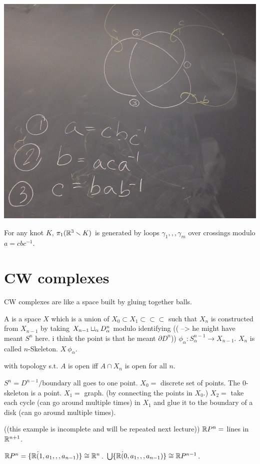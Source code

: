 \documentclass[11pt,leqno,oneside]{amsart}
\numberwithin{thm}{section}
\newcommand{\minus}{\smallsetminus}
\renewcommand{\d}{\partial}
\newcommand{\fund}[1][1]{\pi_{#1}}
\begin{document}
\begin{example}
  \includegraphics[scale=0.2]{images/trefoil-fully-described.jpg}
\end{example}
\begin{thm}[Wirtinger]
  For any knot $K$, $\fund(\R^3\minus K)$ is generated by loops $\gamma_1,,,\gamma_m$ over crossings modulo $a = cbc^{-1}$.
\end{thm}


\section{CW complexes}

CW complexes are like a space built by gluing together balls.
\begin{defn}
  A  is a space $X$ which is a union of $X_0 \subset X_1 \subset \subset \subset$ such that $X_n$ is constructed from $X_{n-1}$ by taking $X_{n-1} \sqcup_{\alpha} D_{\alpha}^n$ modulo identifying (( --> he might have meant $S^n$ here.  i think the point is that he meant $\d D^n$)) $\phi_\alpha \colon S_\alpha^{n-1} \to X_{n-1}$.  $X_n$ is called $n$-Skeleton.  $X ~ \phi_\alpha$.

  with topology s.t. $A$ is open iff $A \cap X_n$ is open for all $n$.
\end{defn}
\begin{example}
  $S^n = D^{n-1}/\text{boundary}$ all goes to one point.
  $X_0 =$ discrete set of points.  The $0$-skeleton is a point.
  $X_1 =$ graph. (by connecting the points in $X_0$.)
  $X_2 =$ take each cycle (can go around multiple times) in $X_1$ and glue it to the boundary of a disk (can go around multiple times).
\end{example}
\begin{example}
  ((this example is incomplete and will be repeated next lecture))
  ${\mathbb R} P^n =$ lines in ${\mathbb R}^{n+1}$.

  ${\mathbb R} P^n = \{ {\mathbb R} \dot (1, a_1,,, a_{n-1})\} \mathrel{\cong} {\mathbb R}^{n}$.
  $\bigcup \{ {\mathbb R} \dot (0, a_1,,, a_{n-1})\} \mathrel{\cong} {\mathbb R} P^{n-1}$.
\end{example}
\end{document}

